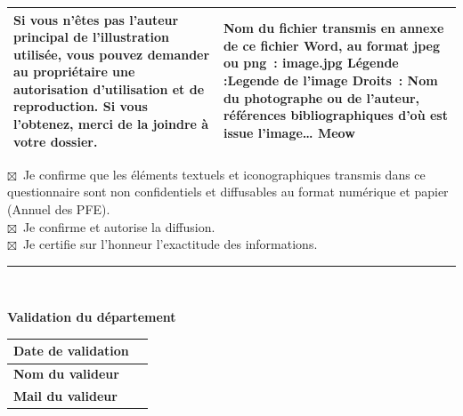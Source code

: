 \documentclass[12pt,a4paper]{article}
\newcommand{\CheckedBox}{\ensuremath{\boxtimes}} %
\begin{document}
\begin{longtable}{|p{7cm}|p{9cm}|}
    Si vous n’êtes pas l’auteur principal de l’illustration utilisée, vous pouvez demander au 
    propriétaire une autorisation d’utilisation et de reproduction. Si vous l’obtenez, merci de
    la joindre à votre dossier.& Nom du fichier transmis en annexe de ce fichier 
    Word, au format jpeg ou png : \newline\newline  image.jpg \newline\newline \textbf{Légende :}\newline\newline Legende de l'image
    \newline\newline Droits : Nom du photographe ou de l’auteur, références bibliographiques d’où est issue l’image…\newline\newline
    Meow\\ \hline
\end{longtable}
\vspace{0.8cm}
\newpage
\noindent $\CheckedBox$~Je confirme que les éléments textuels et iconographiques transmis dans ce questionnaire
sont non confidentiels et diffusables au format numérique et papier (Annuel des PFE).\\[0.25cm]

\noindent $\CheckedBox$~Je confirme et autorise la diffusion.\\[0.25cm]

\noindent $\CheckedBox$~Je certifie sur l'honneur l'exactitude des informations.

\vspace{1cm}

\begin{center}
\rule{4cm}{0.4pt}\\

\end{center}

\vspace{0.8cm}

\textbf{Validation du département}

\vspace{0.2cm}

\begin{tabular}{|p{7cm}|p{9cm}|}
\hline
\textbf{Date de validation} & \\[0.8cm] \hline
\textbf{Nom du valideur} & \\[0.8cm] \hline
\textbf{Mail du valideur} & \\[0.8cm] \hline
\end{tabular}
\end{document}
